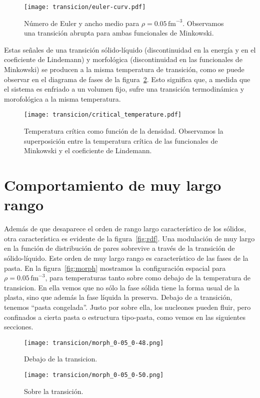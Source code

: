 \begin{figure}%
  \centering \texttt{[image: transicion/euler-curv.pdf]}
  \caption{Número de Euler y ancho medio para $\rho=0.05\,\text{fm}^{-3}$.
    Observamos una transición abrupta para ambas funcionales de Minkowski.}
  \label{fig:euler-curv}
\end{figure}

Estas señales de una transición sólido-líquido (discontinuidad en la energía y en el coeficiente de Lindemann) y morfológica (discontinuidad en las funcionales de Minkowski) se producen a la misma temperatura de transición, como se puede observar en el diagrama de fases de la figura~\ref{fig:critical_temperature}.
Esto significa que, a medida que el sistema es enfriado a un volumen fijo, sufre una transición termodinámica y morofológica a la misma temperatura.

\begin{figure}[floatfix]  \centering
  \texttt{[image: transicion/critical\_temperature.pdf]}
  \caption{Temperatura crítica como función de la densidad.
    Observamos la superposición entre la temperatura crítica de las funcionales de Minkowski y el coeficiente de Lindemann.}
  \label{fig:critical_temperature}
\end{figure}


\section{Comportamiento de muy largo rango}
Además de que desaparece el orden de rango largo característico de los sólidos, otra característica es evidente de la figura~\ref{fig:rdf}.
Una modulación de muy largo en la función de distribución de pares sobrevive a través de la transición de sólido-líquido.
Este orden de muy largo rango es característico de las fases de la pasta.
En la figura~\ref{fig:morph} mostramos la configuración espacial para $\rho=0.05\,\text{fm}^{-3}$, para temperaturas tanto sobre como debajo de la temperatura de transicion.
En ella vemos que no sólo la fase sólida tiene la forma usual de la plasta, sino que además la fase líquida la preserva.
Debajo de a transición, tenemos ``pasta congelada''.
Justo por sobre ella, los nucleones pueden fluir, pero confinados a cierta pasta o estructura tipo-pasta, como vemos en las siguientes secciones.

\begin{figure*}[floatfix]%
  \centering
  \begin{subfigure}[h!]{0.3\columnwidth}
    \texttt{[image: transicion/morph\_0-05\_0-48.png]}
    \caption*{Debajo de la transicion.}
  \end{subfigure}
  \begin{subfigure}[h!]{0.3\columnwidth}
    \texttt{[image: transicion/morph\_0-05\_0-50.png]}
    \caption*{Sobre la transición.}
  \end{subfigure}
  \caption{Distribución espacial para $\rho=0.05\,\text{fm}^{-3}$, tanto sobre como debajo de la temperatura de transición.
    Las estructuras son similares, pero mucho más desordenadas sobre la transición.}
  \label{fig:morph}
\end{figure*}

